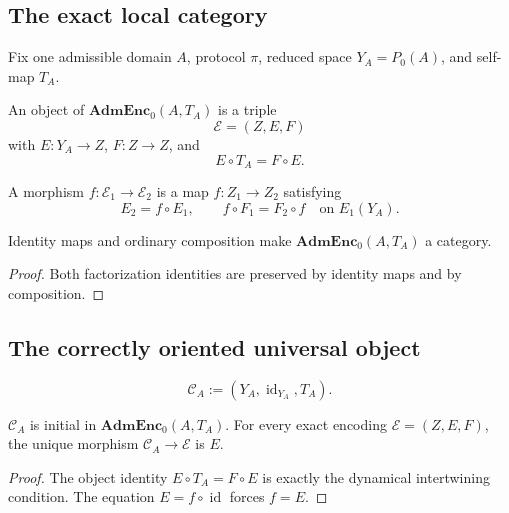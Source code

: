 \documentclass[11pt]{article}
\theoremstyle{plain}
\theoremstyle{plain}
\begin{document}
\subsection{The exact local category}

Fix one admissible domain $A$, protocol $\pi$, reduced space
$Y_A=P_0(A)$, and self-map $T_A$.

\begin{definition}
An object of $\mathbf{AdmEnc}_0(A,T_A)$ is a triple
\[
\mathcal E=(Z,E,F)
\]
with $E:Y_A\to Z$, $F:Z\to Z$, and
\[
E\circ T_A=F\circ E.
\]
\end{definition}

\begin{definition}
A morphism $f:\mathcal E_1\to\mathcal E_2$ is a map
$f:Z_1\to Z_2$ satisfying
\[
E_2=f\circ E_1,
\qquad
f\circ F_1=F_2\circ f
\quad\text{on }E_1(Y_A).
\]
\end{definition}

\begin{proposition}
Identity maps and ordinary composition make
$\mathbf{AdmEnc}_0(A,T_A)$ a category.
\end{proposition}

\begin{proof}
Both factorization identities are preserved by identity maps and by
composition.
\end{proof}

\subsection{The correctly oriented universal object}

\begin{definition}
\[
\mathcal C_A:=(Y_A,\operatorname{id}_{Y_A},T_A).
\]
\end{definition}

\begin{theorem}\label{thm:initiality}
$\mathcal C_A$ is initial in $\mathbf{AdmEnc}_0(A,T_A)$.  For every exact
encoding $\mathcal E=(Z,E,F)$, the unique morphism
$\mathcal C_A\to\mathcal E$ is $E$.
\end{theorem}

\begin{proof}
The object identity $E\circ T_A=F\circ E$ is exactly the dynamical
intertwining condition.  The equation $E=f\circ\operatorname{id}$ forces
$f=E$.
\end{proof}
\end{document}
